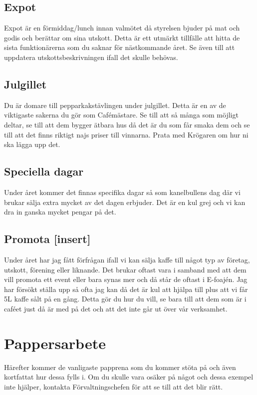 \documentclass[10pt]{article}
\begin{document}
\subsection{Expot}
Expot är en förmiddag/lunch innan valmötet då styrelsen bjuder på mat och godis och berättar om sina utskott. Detta är ett utmärkt tillfälle att hitta de sista funktionärerna som du saknar för nästkommande året. Se även till att uppdatera utskottsbeskrivningen ifall det skulle behövas.

\subsection{Julgillet}
Du är domare till pepparkakstävlingen under julgillet. Detta är en av de viktigaste sakerna du gör som Cafémästare. Se till att så många som möjligt deltar, se till att dem bygger ätbara hus då det är du som får smaka dem och se till att det finns riktigt najs priser till vinnarna. Prata med Krögaren om hur ni ska lägga upp det.

\subsection{Speciella dagar}
Under året kommer det finnas specifika dagar så som kanelbullens dag där vi brukar sälja extra mycket av det dagen erbjuder. Det är en kul grej och vi kan dra in ganska mycket pengar på det.

\subsection{Promota [insert]}
Under året har jag fått förfrågan ifall vi kan sälja kaffe till något typ av företag, utskott, förening eller liknande. Det brukar oftast vara i samband med att dem vill promota ett event eller bara synas mer och då står de oftast i E-foajén. Jag har försökt ställa upp så ofta jag kan då det är kul att hjälpa till plus att vi får 5L kaffe sålt på en gång. Detta gör du hur du vill, se bara till att dem som är i caféet just då är med på det och att det inte går ut över vår verksamhet.

\section{Pappersarbete}
Härefter kommer de vanligaste papprena som du kommer stöta på och även kortfattat hur dessa fylls i. Om du skulle vara osäker på något och dessa exempel inte hjälper, kontakta Förvaltningschefen för att se till att det blir rätt.
\end{document}
